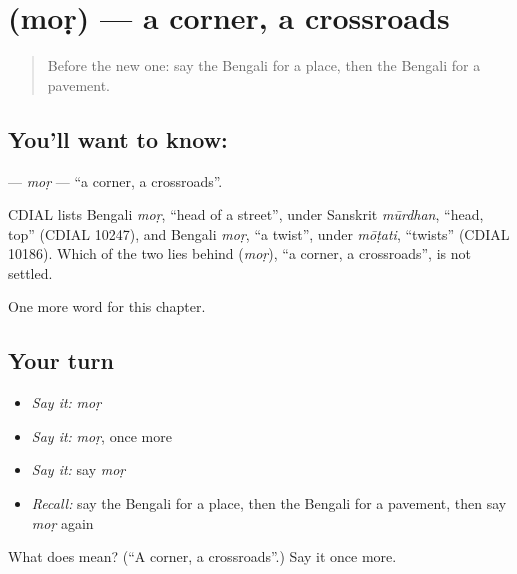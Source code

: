 \section[\texorpdfstring{\bn{মোড়} (moṛ)}{মোড় (moṛ)}]{ (moṛ) — a corner, a crossroads}

\label{lesson:BN-C157-mor}



\begin{quote}
Before the new one: say the Bengali for a place, then the Bengali for a pavement.
\end{quote}

\subsection*{You'll want to know: }
\textbf{} — \emph{moṛ} — \textquotedblleft{}a corner, a crossroads\textquotedblright{}.

\begin{cousinweb}
CDIAL lists Bengali \emph{moṛ}, \textquotedblleft{}head of a street\textquotedblright{}, under Sanskrit \emph{mūrdhan}, \textquotedblleft{}head, top\textquotedblright{} (CDIAL 10247), and Bengali \emph{moṛ}, \textquotedblleft{}a twist\textquotedblright{}, under \emph{mōṭati}, \textquotedblleft{}twists\textquotedblright{} (CDIAL 10186). Which of the two lies behind \textbf{} (\emph{moṛ}), \textquotedblleft{}a corner, a crossroads\textquotedblright{}, is not settled.
\end{cousinweb}

\begin{grammarlens}[title={What you've built}]
One more word for this chapter.
\end{grammarlens}

\subsection*{Your turn}
\begin{itemize}
\raggedright
  \item \emph{Say it:} \emph{moṛ}
  \item \emph{Say it:} \emph{moṛ}, once more
  \item \emph{Say it:} say \emph{moṛ}
  \item \emph{Recall:} say the Bengali for a place, then the Bengali for a pavement, then say \emph{moṛ} again
\end{itemize}

\begin{tcolorbox}[breakable,colback=teal!4,colframe=teal!35!black,title={Before you move on}]
What does  mean? (\textquotedblleft{}A corner, a crossroads\textquotedblright{}.) Say it once more.
\end{tcolorbox}
